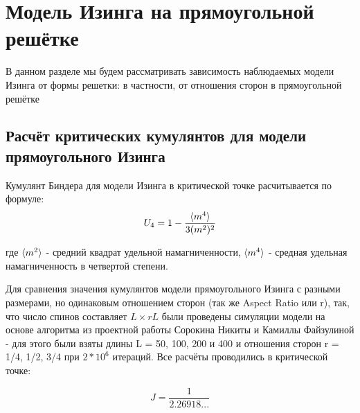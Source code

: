 \section{Модель Изинга на прямоугольной решётке}

В данном разделе мы будем рассматривать зависимость наблюдаемых модели Изинга от формы решетки: в частности, от отношения сторон в прямоугольной решётке

\subsection{Расчёт критических кумулянтов для модели прямоугольного Изинга}

Кумулянт Биндера для модели Изинга в критической точке расчитывается по формуле:
\begin{equation}
\label{eq:Cumulant}
U_{4} = 1 - \frac{\langle m^{4} \rangle}{3 (m^{2})^{2}}
\end{equation}

где $\langle m^{2} \rangle$ - средний квадрат удельной намагниченности, $\langle m^{4} \rangle$ - средная удельная намагниченность в четвертой степени. 

Для сравнения значения кумулянтов модели прямоугольного Изинга с разными размерами, но одинаковым отношением сторон (так же Aspect Ratio или r), так, что число спинов составляет $L \times rL$ были проведены симуляции модели на основе алгоритма из проектной работы Сорокина Никиты \cite{web:SchroedingercatRepos} и Камиллы Файзулиной \cite{web:SAWsRepos} - для этого были взяты длины L = 50, 100, 200 и 400 и отношения сторон r = 1/4, 1/2, 3/4 при $2 * 10^{6}$ итераций. Все расчёты проводились в критической точке\cite{selke2006critical}:

\begin{equation}
\label{eq:Crit_Dot}
J = \frac{1}{2.26918...}
\end{equation}



